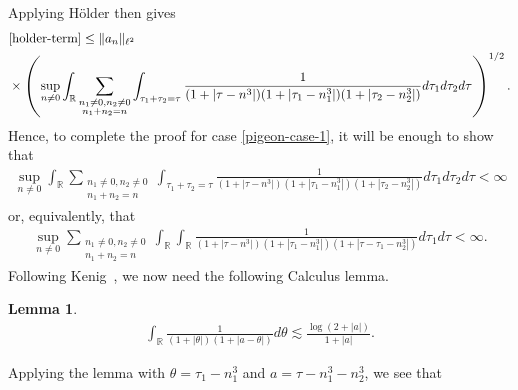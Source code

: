 \documentclass[12pt,reqno]{amsart}
\numberwithin{equation}{section}  %
\numberwithin{figure}{section}
\newcommand{\rr}{\mathbb{R}}
\theoremstyle{plain}
\newtheorem{lemma}{Lemma}
\theoremstyle{definition}
\theoremstyle{remark}
\begin{document}
%
Applying H{\"o}lder then gives
%
%
\begin{equation*}
	\begin{split}
		& \eqref{holder-term}
		 \le \| a_{n} \|_{\ell^2}
		\\
		& \times \left( \sup_{n \neq 0} \int_{\rr}
		\sum_{\substack{n_1 \neq 0, n_2 \neq 0 \\n_1 +n_2 =n}} \int_{\tau_1 + \tau_2
		= \tau} \frac{1}{ (1 + | \tau - n^{3} |)(1 + |
		\tau_{1}-n_{1}^{3} |)(1 + | \tau_2 -n_{2}^{3} |)} d \tau_1 d \tau_2 d \tau
		\right)^{1/2}.
	\end{split}
\end{equation*}
%
%
Hence, to complete the proof for case \eqref{pigeon-case-1}, it will be enough
to show that 
%
%
%
%
\begin{equation*}
	\begin{split}
		 \sup_{n \neq 0} \int_{\rr}
		\sum_{\substack{n_1 \neq 0, n_2 \neq 0 \\n_1 +n_2 =n}} \int_{\tau_1 + \tau_2
		= \tau} \frac{1}{ (1 + | \tau - n^{3} |)(1 + |
		\tau_{1}-n_{1}^{3} |)(1 + | \tau_2 -n_{2}^{3} |)} d \tau_1 d \tau_2 d \tau <\infty
	\end{split}
\end{equation*}
%
%
or, equivalently, that
%
%
\begin{equation}
	\label{12g}
	\begin{split}
		\sup_{n \neq 0} \sum_{\substack{n_1 \neq 0, n_2 \neq 0 \\n_1 +n_2 =n}} \int_{\rr}
		\int_\rr  \frac{1}{(1 + | \tau - n^{3} |)(1 + | \tau_1 - n_{1}^{3} |)(1 + | \tau - \tau_1 -
		n_2^3 |)} d \tau_1 d \tau < \infty.
	\end{split}
\end{equation}
%
%
Following Kenig~\cite{Kenig:1996aa}, we now need the following Calculus lemma.
%
%
%
%
%
%
%
%
\begin{lemma}
	\label{lem:calc}
 \begin{equation}
	 \label{calc}
	 \begin{split}
		 \int_{\rr} \frac{1}{(1 + | \theta |)(1 + | a - \theta |)} d \theta \lesssim
		 \frac{\log(2 + | a |)}{1 + | a |}.
	 \end{split}
 \end{equation}
 \end{lemma}
%
%
Applying the lemma with $\theta = \tau_1 - n_1^3$ and $a = \tau - n_1^3 -
n_2^3$, we see that
\end{document}
